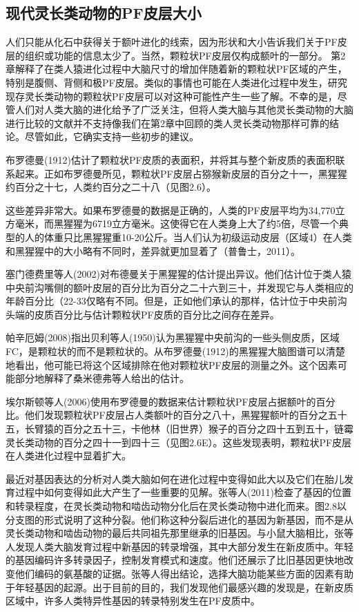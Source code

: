 \subsection{现代灵长类动物的PF皮层大小}
人们只能从化石中获得关于额叶进化的线索，因为形状和大小告诉我们关于PF皮层的组织或功能的信息太少了。当然，颗粒状PF皮层仅构成额叶的一部分。
第2章解释了在类人猿进化过程中大脑尺寸的增加伴随着新的颗粒状PF区域的产生，特别是腹侧、背侧和极PF皮层。类似的事情也可能在人类进化过程中发生，研究现存灵长类动物的颗粒状PF皮层可以对这种可能性产生一些了解。不幸的是，尽管人们对人类大脑的进化给予了广泛关注，但将人类大脑与其他灵长类动物的大脑进行比较的文献并不支持像我们在第2章中回顾的类人灵长类动物那样可靠的结论。尽管如此，它确实支持一些初步的建议。
\par
布罗德曼(1912)估计了颗粒状PF皮质的表面积，并将其与整个新皮质的表面积联系起来。正如布罗德曼所见，颗粒状PF皮层占猕猴新皮层的百分之十一，黑猩猩约百分之十七，人类约百分之二十八（见图2.6）。
\par
这些差异非常大。如果布罗德曼的数据是正确的，人类的PF皮层平均为34,770立方毫米，而黑猩猩为6719立方毫米。这使得它在人类身上大了约5倍，尽管一个典型的人的体重只比黑猩猩重10-20公斤。当人们认为初级运动皮层（区域4）在人类和黑猩猩中的大小略有不同时，差异就更加显着了（普鲁士，2011）。
\par
塞门德费里等人(2002)对布德曼关于黑猩猩的估计提出异议。他们估计位于类人猿中央前沟嘴侧的额叶皮层的百分比为百分之二十六到三十，并发现它与人类相应的年龄百分比（22-33仅略有不同。但是，正如他们承认的那样，估计位于中央前沟头端的皮质百分比与估计颗粒状PF皮质的百分比之间存在差异。
\par
帕辛厄姆(2008)指出贝利等人(1950)认为黑猩猩中央前沟的一些头侧皮质，区域FC，是颗粒状的而不是颗粒状的。从布罗德曼(1912)的黑猩猩大脑图谱可以清楚地看出，他可能已将这个区域排除在他对颗粒状PF皮层的测量之外。这个因素可能部分地解释了桑米德弗等人给出的估计。
\par
埃尔斯顿等人(2006)使用布罗德曼的数据来估计颗粒状PF皮层占据额叶的百分比。他们发现颗粒状PF皮层占人类额叶的百分之八十，黑猩猩额叶的百分之五十五，长臂猿的百分之五十三，卡他林（旧世界）猴子的百分之四十五到五十，链霉灵长类动物的百分之四十一到四十三（见图2.6E）。这些发现表明，颗粒状PF皮层在人类进化过程中显着扩大。
\par
最近对基因表达的分析对人类大脑如何在进化过程中变得如此大以及它们在胎儿发育过程中如何变得如此大产生了一些重要的见解。张等人(2011)检查了基因的位置和转录程度，在灵长类动物和啮齿动物分化后在灵长类动物中进化而来。图2.8以分支图的形式说明了这种分裂。他们称这种分裂后进化的基因为新基因，而不是从灵长类动物和啮齿动物的最后共同祖先那里继承的旧基因。与小鼠大脑相比，张等人发现人类大脑发育过程中新基因的转录增强，其中大部分发生在新皮质中。年轻的基因编码许多转录因子，控制发育模式和速度。他们还展示了比旧基因更快地改变他们编码的氨基酸的证据。张等人得出结论，选择大脑功能某些方面的因素有助于年轻基因的起源。出于目前的目的，我们发现他们最感兴趣的发现是，在新皮质区域中，许多人类特异性基因的转录特别发生在PF皮质中。
